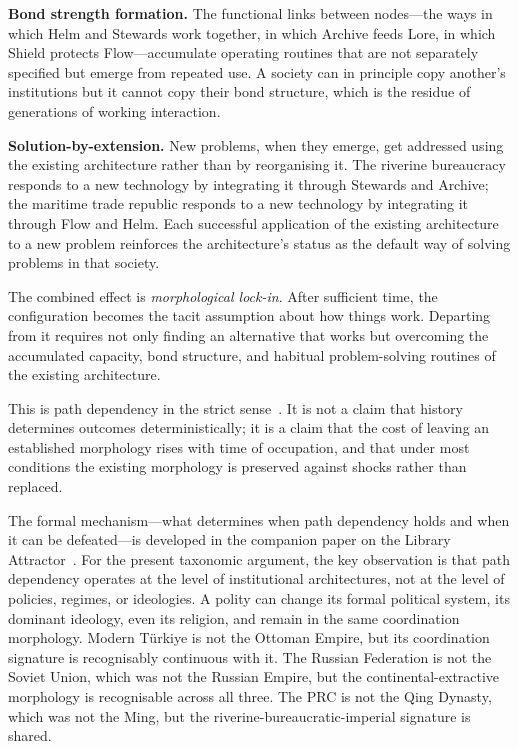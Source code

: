 \documentclass[12pt,a4paper]{article}
\begin{document}
\textbf{Bond strength formation.} The functional links between nodes---the ways in which Helm and Stewards work together, in which Archive feeds Lore, in which Shield protects Flow---accumulate operating routines that are not separately specified but emerge from repeated use. A society can in principle copy another's institutions but it cannot copy their bond structure, which is the residue of generations of working interaction.

\textbf{Solution-by-extension.} New problems, when they emerge, get addressed using the existing architecture rather than by reorganising it. The riverine bureaucracy responds to a new technology by integrating it through Stewards and Archive; the maritime trade republic responds to a new technology by integrating it through Flow and Helm. Each successful application of the existing architecture to a new problem reinforces the architecture's status as the default way of solving problems in that society.

The combined effect is \textit{morphological lock-in}. After sufficient time, the configuration becomes the tacit assumption about how things work. Departing from it requires not only finding an alternative that works but overcoming the accumulated capacity, bond structure, and habitual problem-solving routines of the existing architecture.

This is path dependency in the strict sense~\cite{pierson2000}. It is not a claim that history determines outcomes deterministically; it is a claim that the cost of leaving an established morphology rises with time of occupation, and that under most conditions the existing morphology is preserved against shocks rather than replaced.

The formal mechanism---what determines when path dependency holds and when it can be defeated---is developed in the companion paper on the Library Attractor~\cite{mckern2026library}. For the present taxonomic argument, the key observation is that path dependency operates at the level of institutional architectures, not at the level of policies, regimes, or ideologies. A polity can change its formal political system, its dominant ideology, even its religion, and remain in the same coordination morphology. Modern T\"{u}rkiye is not the Ottoman Empire, but its coordination signature is recognisably continuous with it. The Russian Federation is not the Soviet Union, which was not the Russian Empire, but the continental-extractive morphology is recognisable across all three. The PRC is not the Qing Dynasty, which was not the Ming, but the riverine-bureaucratic-imperial signature is shared.
\end{document}
